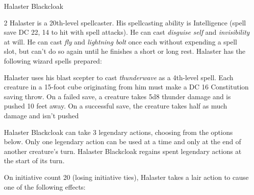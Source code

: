 \documentclass[10pt,a4paper,twoside,bg=print,twocolumn,openany,nodeprecatedcode]{dndbook}
\begin{document}
\begin{DndMonster}[float*=b,width=\textwidth + 8pt]{Halaster Blackcloak}
\begin{multicols}{2}
Halaster is a 20th-level spellcaster. His spellcasting ability is Intelligence (spell save DC 22, 14 to hit with spell attacks). He can cast \textit{disguise self} and \textit{invisibility} at will. He can cast \textit{fly} and \textit{lightning bolt} once each without expending a spell slot, but can't do so again until he finishes a short or long rest. Halaster has the following wizard spells prepared:
\begin{DndMonsterSpells}
\end{DndMonsterSpells}
Halaster uses his blast scepter to cast \textit{thunderwave} as a 4th-level spell. Each creature in a 15-foot cube originating from him must make a DC 16 Constitution saving throw. On a failed save, a creature takes 5d8 thunder damage and is pushed 10 feet away. On a successful save, the creature takes half as much damage and isn't pushed

Halaster Blackcloak can take 3 legendary actions, choosing from the options below. Only one legendary action can be used at a time and only at the end of another creature's turn. Halaster Blackcloak regains spent legendary actions at the start of its turn.

\begin{DndMonsterLegendaryActions}
\end{DndMonsterLegendaryActions}
On initiative count 20 (losing initiative ties), Halaster takes a lair action to cause one of the following effects:



\end{multicols}
\end{DndMonster}
\end{document}
